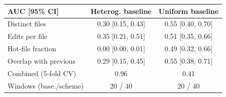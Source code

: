 \begin{tabular}{l@{\hspace{4pt}}c@{\hspace{4pt}}c}
\toprule
AUC [95\% CI] & Heterog. baseline & Uniform baseline\\
\midrule
Distinct files & 0.30 [0.15, 0.43] & 0.55 [0.40, 0.70]\\
Edits per file & 0.35 [0.21, 0.51] & 0.51 [0.35, 0.66]\\
Hot-file fraction & 0.00 [0.00, 0.01] & 0.49 [0.32, 0.66]\\
Overlap with previous & 0.29 [0.15, 0.45] & 0.55 [0.38, 0.71]\\
Combined (5-fold CV) & 0.96 & 0.41\\
Windows (base./scheme) & 20 / 40 & 20 / 40\\
\bottomrule
\end{tabular}
